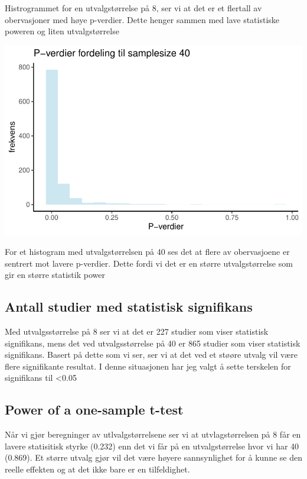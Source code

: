 \documentclass[
  letterpaper,
  DIV=11,
  numbers=noendperiod]{scrreprt}
\begin{document}
Histrogrammet for en utvalgstørrelse på 8, ser vi at det er et flertall
av obervasjoner med høye p-verdier. Dette henger sammen med lave
statistiske poweren og liten utvalgstørrelse

\includegraphics{03-statistical-inference_files/figure-pdf/P-verdi histogram SS40-1.pdf}

For et histogram med utvalgstørrelsen på 40 ses det at flere av
obervasjoene er sentrert mot lavere p-verdier. Dette fordi vi det er en
større utvalgstørrelse som gir en større statistik power

\subsection{Antall studier med statistisk
signifikans}\label{antall-studier-med-statistisk-signifikans}

Med utvalgsstørrelse på 8 ser vi at det er 227 studier som viser
statistisk signifikans, mens det ved utvalgsstørrelse på 40 er 865
studier som viser statistisk signifikans. Basert på dette som vi ser,
ser vi at det ved et støøre utvalg vil være flere signifikante resultat.
I denne situasjonen har jeg valgt å sette terskelen for signifikans til
\textless0.05

\subsection{Power of a one-sample
t-test}\label{power-of-a-one-sample-t-test}

Når vi gjør beregninger av utlvalgstørrelsene ser vi at utvlagstørrelsen
på 8 får en lavere statisitisk styrke (0.232) enn det vi får på en
utvalgstørrelse hvor vi har 40 (0.869). Et større utvalg gjør vil det
være høyere sannsynlighet for å kunne se den reelle effekten og at det
ikke bare er en tilfeldighet.
\end{document}
